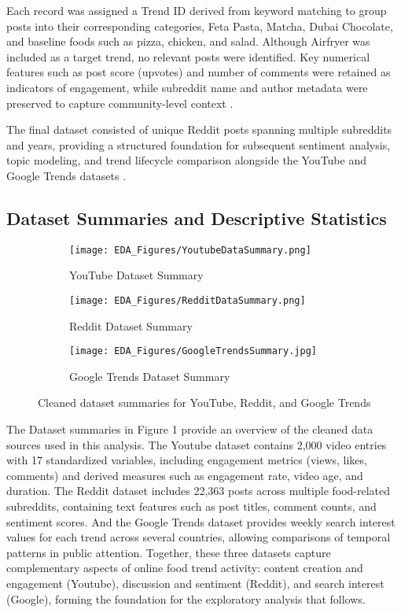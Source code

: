 \documentclass{article}
\begin{document}
Each record was assigned a Trend ID derived from keyword matching to group posts into their corresponding categories, Feta Pasta, Matcha, Dubai Chocolate, and baseline foods such as pizza, chicken, and salad. Although Airfryer was included as a target trend, no relevant posts were identified. Key numerical features such as post score (upvotes) and number of comments were retained as indicators of engagement, while subreddit name and author metadata were preserved to capture community-level context \citep{reddit_api_praw}.

The final dataset consisted of unique Reddit posts spanning multiple subreddits and years, providing a structured foundation for subsequent sentiment analysis, topic modeling, and trend lifecycle comparison alongside the YouTube and Google Trends datasets \citep{reddit_api_praw}.

\subsection{Dataset Summaries and Descriptive Statistics}
\begin{figure}[H]
    \centering
    \begin{subfigure}[t]{0.32\textwidth}
        \centering
        \texttt{[image: EDA\_Figures/YoutubeDataSummary.png]}
        \caption{YouTube Dataset Summary}
        \label{fig:youtube-summary}
    \end{subfigure}
    \begin{subfigure}[t]{0.32\textwidth}
        \centering
        \texttt{[image: EDA\_Figures/RedditDataSummary.png]}
        \caption{Reddit Dataset Summary}
        \label{fig:reddit-summary}
    \end{subfigure}
    \begin{subfigure}[t]{0.32\textwidth}
        \centering
        \texttt{[image: EDA\_Figures/GoogleTrendsSummary.jpg]}
        \caption{Google Trends Dataset Summary}
        \label{fig:pytrends-summary}
    \end{subfigure}
    \caption{Cleaned dataset summaries for YouTube, Reddit, and Google Trends}
    \label{fig:dataset-summaries}
\end{figure}

The Dataset summaries in Figure 1 provide an overview of the cleaned data sources used in this analysis. The Youtube dataset contains 2,000 video entries with 17 standardized variables, including engagement metrics (views, likes, comments) and derived measures such as engagement rate, video age, and duration. The Reddit dataset includes 22,363 posts across multiple food-related subreddits, containing text features such as post titles, comment counts, and sentiment scores. And the Google Trends dataset provides weekly search interest values for each trend across several countries, allowing comparisons of temporal patterns in public attention. Together, these three datasets capture complementary aspects of online food trend activity: content creation and engagement (Youtube), discussion and sentiment (Reddit), and search interest (Google), forming the foundation for the exploratory analysis that follows. 
\end{document}
